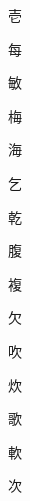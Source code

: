 \begin{spacing}{2.5}
{\Huge \begin{CJK}{UTF8}{min} 壱\end{CJK}}\hspace{0.1cm}
{\Huge \begin{CJK}{UTF8}{min} 每\end{CJK}}\hspace{0.1cm}
{\Huge \begin{CJK}{UTF8}{min} 敏\end{CJK}}\hspace{0.1cm}
{\Huge \begin{CJK}{UTF8}{min} 梅\end{CJK}}\hspace{0.1cm}
{\Huge \begin{CJK}{UTF8}{min} 海\end{CJK}}\hspace{0.1cm}
{\Huge \begin{CJK}{UTF8}{min} 乞\end{CJK}}\hspace{0.1cm}
{\Huge \begin{CJK}{UTF8}{min} 乾\end{CJK}}\hspace{0.1cm}
{\Huge \begin{CJK}{UTF8}{min} 腹\end{CJK}}\hspace{0.1cm}
{\Huge \begin{CJK}{UTF8}{min} 複\end{CJK}}\hspace{0.1cm}
{\Huge \begin{CJK}{UTF8}{min} 欠\end{CJK}}\hspace{0.1cm}
{\Huge \begin{CJK}{UTF8}{min} 吹\end{CJK}}\hspace{0.1cm}
{\Huge \begin{CJK}{UTF8}{min} 炊\end{CJK}}\hspace{0.1cm}
{\Huge \begin{CJK}{UTF8}{min} 歌\end{CJK}}\hspace{0.1cm}
{\Huge \begin{CJK}{UTF8}{min} 軟\end{CJK}}\hspace{0.1cm}
{\Huge \begin{CJK}{UTF8}{min} 次\end{CJK}}\hspace{0.1cm}

\end{spacing}
